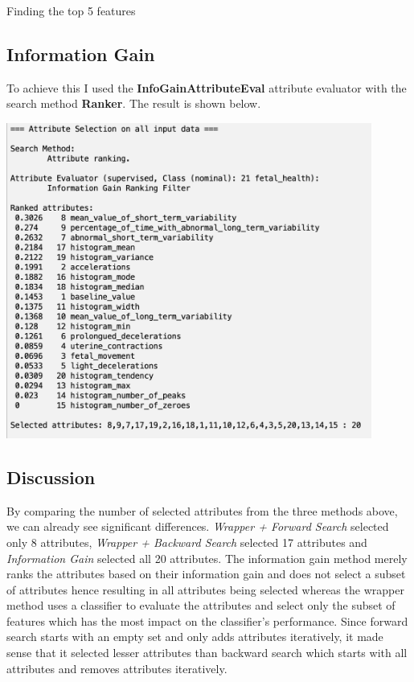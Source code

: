 \documentclass[12pt]{article}
\begin{document}
\begin{section}{Finding the top 5 features}
 \subsection{Information Gain}
 To achieve this I used the \textbf{InfoGainAttributeEval} attribute evaluator with
 the search method \textbf{Ranker}. The result is shown below.

 \begin{center}
     \includegraphics[width=12cm]{images/5_2_information_gain.png}
 \end{center}

 \subsection{Discussion}
 By comparing the number of selected attributes from the three methods above, we can already see significant
 differences. \textit{Wrapper + Forward Search} selected only 8 attributes, \textit{Wrapper + Backward Search}
 selected 17 attributes and \textit{Information Gain} selected all 20 attributes. The information gain method
 merely ranks the attributes based on their information gain and does not select a subset of attributes hence
 resulting in all attributes being selected whereas the wrapper method uses a classifier to evaluate
 the attributes and select only the subset of features which has the most impact on the classifier's performance.
 Since forward search starts with an empty set and only adds attributes iteratively, it made sense that it selected
 lesser attributes than backward search which starts with all attributes and removes attributes iteratively.
\end{section}
\end{document}
